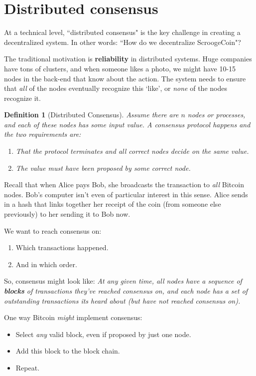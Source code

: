 \documentclass[12pt]{article}
\newtheorem*{mydef}{Definition}
\begin{document}
\section*{Distributed consensus}

At a technical level, ``distributed consensus" is the key challenge in creating a decentralized system. In other words: ``How do we decentralize ScroogeCoin"?

The traditional motivation is \textbf{reliability} in distributed systems. Huge companies have tons of clusters, and when someone likes a photo, we might have 10-15 nodes in the back-end that know about the action. The system needs to ensure that \textit{all} of the nodes eventually recognize this `like', or \textit{none} of the nodes recognize it.

\begin{mydef}[Distributed Consensus]
Assume there are $n$ nodes or processes, and each of these nodes has some input value. A consensus protocol happens and the two requirements are:
\begin{enumerate}
\item That the protocol terminates and all correct nodes decide on the same value.
\item The value must have been proposed by \textit{some} correct node.
\end{enumerate}
\end{mydef}

Recall that when Alice pays Bob, she broadcasts the transaction to \textit{all} Bitcoin nodes. Bob's computer isn't even of particular interest in this sense. Alice sends in a  hash that links together her receipt of the coin (from someone else previously) to her sending it to Bob now.

We want to reach consensus on:
\begin{enumerate}
\item Which transactions happened.
\item And in which order.
\end{enumerate}

So, consensus might look like: \textit{At any given time, all nodes have a sequence of \textbf{blocks} of transactions they've reached consensus on, and each node has a set of outstanding transactions its heard about (but have not reached consensus on).}

One way Bitcoin \textit{might} implement consensus:
\begin{itemize}
\item Select \textit{any} valid block, even if proposed by just one node.
\item Add this block to the block chain.
\item Repeat.
\end{itemize}
\end{document}
